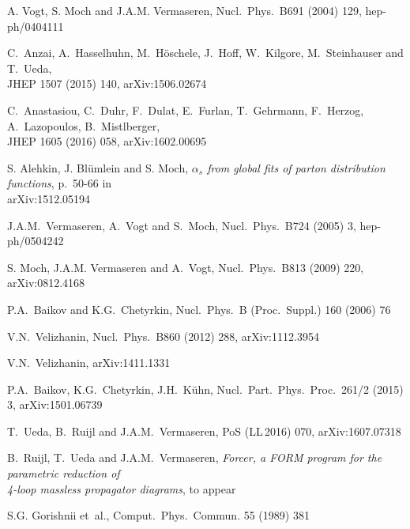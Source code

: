 \documentclass[12pt]{article}
\begin{document}
{\begin{thebibliography}{99}
A. Vogt, S. Moch and J.A.M. Vermaseren,
  Nucl.\ Phys.\ B691 (2004) 129, hep-ph/0404111

C.~Anzai, A.~Hasselhuhn, M.~H\"oschele, J.~Hoff, W.~Kilgore,
M.~Steinhauser and T.~Ueda,\\[1mm]
  JHEP 1507 (2015) 140, arXiv:1506.02674
 
C.~Anastasiou, C.~Duhr, F.~Dulat, E.~Furlan, T.~Gehrmann, F.~Herzog,
A.~Lazopoulos, B.~Mistlberger,\\[1mm]
  JHEP 1605 (2016) 058, arXiv:1602.00695

 S. Alehkin, J. Bl\"umlein and S. Moch,
  {\it $\alpha_s$ from global fits of parton distribution functions},
  p.~50-66 in\\[1mm] arXiv:1512.05194

J.A.M.~Vermaseren, A.~Vogt and S.~Moch,
  Nucl.\ Phys.\ B724 (2005) 3, hep-ph/0504242

S. Moch, J.A.M. Vermaseren and A.~Vogt,
  Nucl.\ Phys.\ B813 (2009) 220, arXiv:0812.4168 

P.A.~Baikov and K.G.~Chetyrkin,
  Nucl.~Phys.~B (Proc.~Suppl.) 160 (2006) 76

V.N.~Velizhanin,
  Nucl.\ Phys.\ B860 (2012) 288, arXiv:1112.3954

V.N.~Velizhanin,
  arXiv:1411.1331

P.A.~Baikov, K.G.~Chetyrkin, J.H.~K\"uhn,
  Nucl.\ Part.\ Phys.\ Proc.\ 261/2 (2015) 3, arXiv:1501.06739

T.~Ueda, B.~Ruijl and J.A.M.~Vermaseren,
  PoS (LL$\,$2016) 070, arXiv:1607.07318 

B.~Ruijl, T.~Ueda and J.A.M.~Vermaseren, 
{\it Forcer, a FORM program for the parametric reduction of\\[1mm]
 4-loop massless propagator diagrams}, to appear

S.G. Gorishnii et~al.,
  Comput.\ Phys.\ Commun. 55 (1989) 381


\end{thebibliography}}
\end{document}

